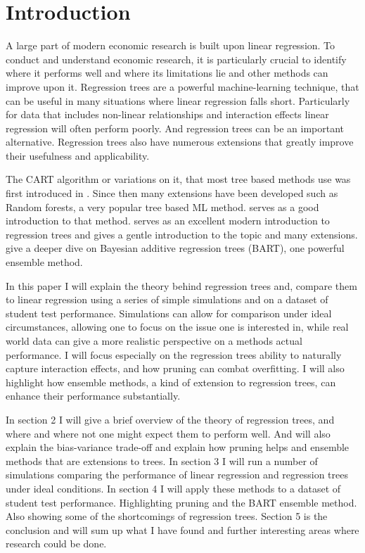\documentclass[12pt]{article}
\begin{document}



\tableofcontents


\section{Introduction}

A large part of modern economic research is built upon linear regression. To conduct and understand economic research, it is particularly crucial to identify where it performs well and where its limitations lie and other methods can improve upon it. Regression trees are a powerful machine-learning technique, that can be useful in many situations where linear regression falls short. Particularly for data that includes non-linear relationships and interaction effects linear regression will often perform poorly. And regression trees can be an important alternative. Regression trees also have numerous extensions that greatly improve their usefulness and applicability.

The CART algorithm or variations on it, that most tree based methods use was first introduced in \citep{breiman1984}. Since then many extensions have been developed such as Random forests, a very popular tree based ML method. \citep{biau2016} serves as a good introduction to that method. \citep{hastie2021} serves as an excellent modern introduction to regression trees and gives a gentle introduction to the topic and many extensions. \citep{tan2019} give a deeper dive on Bayesian additive regression trees (BART), one powerful ensemble method.

In this paper I will explain the theory behind regression trees and, compare them to linear regression using a series of simple simulations and on a dataset of student test performance. Simulations can allow for comparison under ideal circumstances, allowing one to focus on the issue one is interested in, while real world data can give a more realistic perspective on a methods actual performance. I will focus especially on the regression trees ability to naturally capture interaction effects, and how pruning can combat overfitting. I will also highlight how ensemble methods, a kind of extension to regression trees, can enhance their performance substantially.

In section 2 I will give a brief overview of the theory of regression trees, and where and where not one might expect them to perform well. And will also explain the bias-variance trade-off and explain how pruning helps and ensemble methods that are extensions to trees. In section 3 I will run a number of simulations comparing the performance of linear regression and regression trees under ideal conditions. In section 4 I will apply these methods to a dataset of student test performance. Highlighting pruning and the BART ensemble method. Also showing some of the shortcomings of regression trees. Section 5 is the conclusion and will sum up what I have found and further interesting areas where research could be done.
\end{document}
